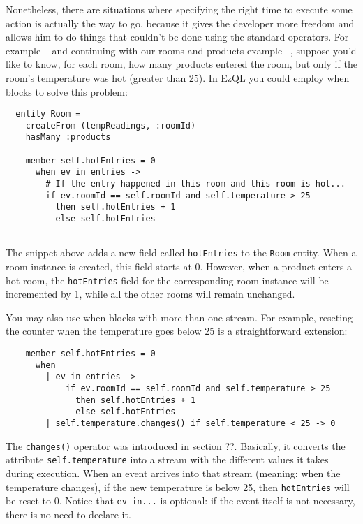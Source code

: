 \documentclass[a4,11pt]{report}
\begin{document}
Nonetheless, there are situations where specifying the right time to
execute some action is actually the way to go, because it gives the
developer more freedom and allows him to do things that couldn't be
done using the standard operators. For example -- and continuing with
our rooms and products example --, suppose you'd like to know, for
each room, how many products entered the room, but only if the room's
temperature was hot (greater than 25). In EzQL you could employ when
blocks to solve this problem:

\begin{lstlisting}
  entity Room =
    createFrom (tempReadings, :roomId)
    hasMany :products

    member self.hotEntries = 0
      when ev in entries ->
        # If the entry happened in this room and this room is hot...
        if ev.roomId == self.roomId and self.temperature > 25
          then self.hotEntries + 1
          else self.hotEntries


\end{lstlisting}

The snippet above adds a new field called \verb=hotEntries= to the
\verb=Room= entity. When a room instance is created, this field starts
at 0. However, when a product enters a hot room, the \verb=hotEntries=
field for the corresponding room instance will be incremented by 1,
while all the other rooms will remain unchanged.

You may also use when blocks with more than one stream. For example,
reseting the counter when the temperature goes below 25 is a
straightforward extension:

\begin{lstlisting}
    member self.hotEntries = 0
      when
        | ev in entries ->
            if ev.roomId == self.roomId and self.temperature > 25
              then self.hotEntries + 1
              else self.hotEntries
        | self.temperature.changes() if self.temperature < 25 -> 0
\end{lstlisting}

The \verb=changes()= operator was introduced in section ??. Basically,
it converts the attribute \verb=self.temperature= into a stream with
the different values it takes during execution. When an event arrives
into that stream (meaning: when the temperature changes), if the new
temperature is below 25, then \verb=hotEntries= will be reset to
0. Notice that \verb=ev in...= is optional: if the event itself is not
necessary, there is no need to declare it.
\end{document}
